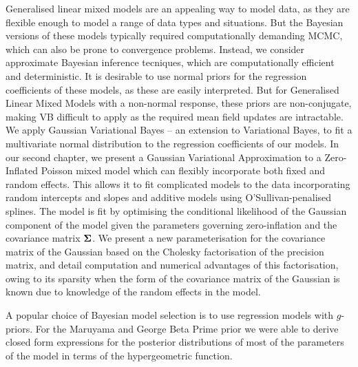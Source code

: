 Generalised linear mixed models are an appealing way to model data, as they are flexible enough to model a
range of data types and situations. But the Bayesian versions of these models typically required 
computationally demanding MCMC, which can also be prone to convergence problems. Instead, we consider approximate Bayesian inference tecniques, which are computationally efficient and deterministic. It is
desirable to use normal priors for the regression coefficients of these models, as these are easily
interpreted. But for Generalised Linear Mixed Models with a non-normal response, these priors are
non-conjugate, making VB difficult to apply as the required mean field updates are intractable. We apply
Gaussian Variational Bayes -- an extension to Variational Bayes, to fit a multivariate normal distribution
to the regression coefficients of our models.
In our second chapter, we present a Gaussian Variational Approximation to a Zero-Inflated Poisson mixed model
which can flexibly incorporate both fixed and random effects. This allows it to fit complicated models
to the data incorporating random intercepts and slopes and additive models using O'Sullivan-penalised splines.
The model is fit by optimising the conditional likelihood of the Gaussian component of the model given the
parameters governing zero-inflation and the covariance matrix ${\boldsymbol \Sigma}$.
We present a new parameterisation for the covariance matrix of the Gaussian based on the Cholesky
factorisation of the precision matrix, and detail computation and numerical advantages of this
factorisation, owing to its sparsity when the form of the covariance matrix of the Gaussian is known due to
knowledge of the random effects in the model.


A popular choice of Bayesian model selection is to use regression models with $g$-priors. For the Maruyama
and George Beta Prime prior \citep{Maruyama2011} we were able to derive closed form expressions for the
posterior distributions of most of the parameters of the model in terms of the hypergeometric function.



